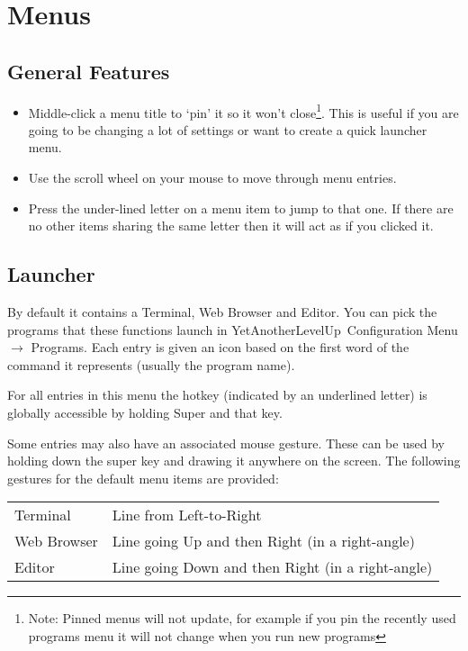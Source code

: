 \documentclass[a4paper,11pt]{article}
\newcommand{\yalu}{YetAnotherLevelUp}
\begin{document}
	\newcommand{\ra}{$\rightarrow$}
	\clearpage
	\section{Menus}
		\subsection{General Features}
			\begin{itemize}
				\item Middle-click a menu title to `pin' it so it won't
					close\footnote{Note: Pinned menus will not update, for example if you
					pin the recently used programs menu it will not change when you run new
					programs}. This is useful if you are going to be changing a lot of
					settings or want to create a quick launcher menu.
				\item Use the scroll wheel on your mouse to move through menu entries.
				\item Press the under-lined letter on a menu item to jump to that one.
					If there are no other items sharing the same letter then it will act
					as if you clicked it.
			\end{itemize}
		
		\subsection{Launcher}
			By default it contains a Terminal, Web Browser and Editor. You can pick
			the programs that these functions launch in \yalu\ Configuration Menu \ra
			Programs. Each entry is given an icon based on the first word of the
			command it represents (usually the program name).
			
			For all entries in this menu the hotkey (indicated by an underlined
			letter) is globally accessible by holding Super and that key.
			
			Some entries may also have an associated mouse gesture. These can be used
			by holding down the super key and drawing it anywhere on the screen. The
			following gestures for the default menu items are provided:
			\begin{longtable}{l l}
				Terminal & Line from Left-to-Right \\
				Web Browser & Line going Up and then Right (in a right-angle) \\
				Editor & Line going Down and then Right (in a right-angle) \\
			\end{longtable}
			
\end{document}
